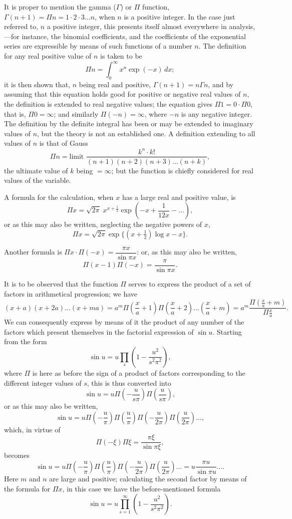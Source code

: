 \documentclass[11pt,a4paper]{article}
\begin{document}
It is proper to mention the gamma ($\Gamma$) or $\Pi$ function, $\Gamma(n + 1) = \Pi n = 1 \cdot 2 \cdot 3 \ldots n$, when $n$ is a positive integer. In the case just referred to, $n$ a positive integer, this presents itself almost everywhere in analysis,---for instance, the binomial coefficients, and the coefficients of the exponential series are expressible by means of such functions of a number $n$. The definition for any real positive value of $n$ is taken to be
\[
\Pi n = \int_{0}^{\infty} x^{n}\exp(-x)\,dx;
\]
it is then shown that, $n$ being real and positive, $\Gamma(n + 1) = n\Gamma n$, and by assuming that this equation holds good for positive or negative real values of $n$, the definition is extended to real negative values; the equation gives $\Pi 1 = 0 \cdot \Pi 0$, that is, $\Pi 0 = \infty$; and similarly $\Pi(-n) = \infty$, where $-n$ is any negative integer. The definition by the definite integral has been or may be extended to imaginary values of $n$, but the theory is not an established one. A definition extending to all values of $n$ is that of Gauss
\[
\Pi n = \text{limit } \frac{k^{n} \cdot k!}{(n + 1)(n + 2)(n + 3)\ldots(n + k)},
\]
the ultimate value of $k$ being $= \infty$; but the function is chiefly considered for real values of the variable.

A formula for the calculation, when $x$ has a large real and positive value, is
\[
\Pi x = \sqrt{2\pi}\; x^{x + \frac{1}{2}}\exp(-x + \frac{1}{12x} - \ldots),
\]
or as this may also be written, neglecting the negative powers of $x$,
\[
\Pi x = \sqrt{2\pi}\exp\{(x + \tfrac{1}{2})\log x - x\}.
\]

Another formula is $\Pi x \cdot \Pi(-x) = \dfrac{\pi x}{\sin\pi x}$: or, as this may also be written,
\[
\Pi(x - 1)\Pi(-x) = \frac{\pi}{\sin\pi x}.
\]

It is to be observed that the function $\Pi$ serves to express the product of a set of factors in arithmetical progression; we have
\[
(x + a)(x + 2a)\ldots(x + ma) = a^{m}\Pi\left(\frac{x}{a} + 1\right)\Pi\left(\frac{x}{a} + 2\right)\ldots\left(\frac{x}{a} + m\right) = a^{m}\frac{\Pi(\frac{x}{a} + m)}{\Pi\frac{x}{a}}.
\]
We can consequently express by means of it the product of any number of the factors which present themselves in the factorial expression of $\sin u$. Starting from the form
\[
\sin u = u\prod_{s}\left(1 - \frac{u^{2}}{s^{2}\pi^{2}}\right),
\]
where $\Pi$ is here as before the sign of a product of factors corresponding to the different integer values of $s$, this is thus converted into
\[
\sin u = u\Pi\left(-\frac{u}{s\pi}\right)\Pi\left(\frac{u}{s\pi}\right),
\]
or as this may also be written,
\[
\sin u = u\Pi\left(-\frac{u}{\pi}\right)\Pi\left(\frac{u}{\pi}\right)\Pi\left(-\frac{u}{2\pi}\right)\Pi\left(\frac{u}{2\pi}\right)\ldots,
\]
which, in virtue of
\[
\Pi(-\xi)\Pi\xi = \frac{\pi\xi}{\sin\pi\xi},
\]
becomes
\[
\sin u = u\Pi\left(-\frac{u}{\pi}\right)\Pi\left(\frac{u}{\pi}\right)\Pi\left(-\frac{u}{2\pi}\right)\Pi\left(\frac{u}{2\pi}\right)\ldots = u\frac{\pi u}{\sin\pi u}\ldots.
\]
Here $m$ and $n$ are large and positive; calculating the second factor by means of the formula for $\Pi x$, in this case we have the before-mentioned formula
\[
\sin u = u\prod_{s=1}^{\infty}\left(1 - \frac{u^{2}}{s^{2}\pi^{2}}\right).
\]
\end{document}
